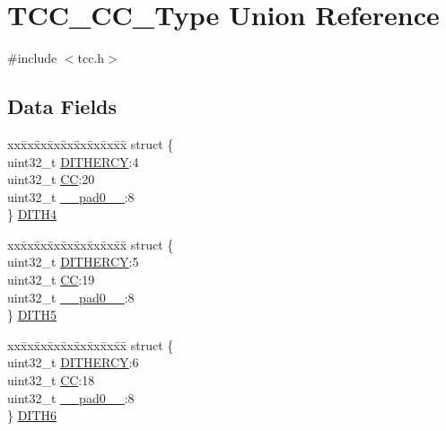 \hypertarget{union_t_c_c___c_c___type}{}\section{T\+C\+C\+\_\+\+C\+C\+\_\+\+Type Union Reference}
\label{union_t_c_c___c_c___type}


{\ttfamily \#include $<$tcc.\+h$>$}

\subsection*{Data Fields}
\begin{DoxyCompactItemize}
\item 
\begin{tabbing}
xx\=xx\=xx\=xx\=xx\=xx\=xx\=xx\=xx\=\kill
struct \{\\
\>uint32\_t \mbox{\hyperlink{union_t_c_c___c_c___type_a1e7fc84641e39de898f29ee9268f22aa}{DITHERCY}}:4\\
\>uint32\_t \mbox{\hyperlink{union_t_c_c___c_c___type_a10f2b0518af5a37e14c710d230272d1d}{CC}}:20\\
\>uint32\_t \mbox{\hyperlink{union_t_c_c___c_c___type_a3e57c2ef1c3ffb36722f000cc1156824}{\_\_pad0\_\_}}:8\\
\} \mbox{\hyperlink{union_t_c_c___c_c___type_adeba68363c81bde605f391e07458b2a8}{DITH4}}\\

\end{tabbing}\item 
\begin{tabbing}
xx\=xx\=xx\=xx\=xx\=xx\=xx\=xx\=xx\=\kill
struct \{\\
\>uint32\_t \mbox{\hyperlink{union_t_c_c___c_c___type_a1e7fc84641e39de898f29ee9268f22aa}{DITHERCY}}:5\\
\>uint32\_t \mbox{\hyperlink{union_t_c_c___c_c___type_a10f2b0518af5a37e14c710d230272d1d}{CC}}:19\\
\>uint32\_t \mbox{\hyperlink{union_t_c_c___c_c___type_a3e57c2ef1c3ffb36722f000cc1156824}{\_\_pad0\_\_}}:8\\
\} \mbox{\hyperlink{union_t_c_c___c_c___type_acd2104636914a582089bbca8543dbfa1}{DITH5}}\\

\end{tabbing}\item 
\begin{tabbing}
xx\=xx\=xx\=xx\=xx\=xx\=xx\=xx\=xx\=\kill
struct \{\\
\>uint32\_t \mbox{\hyperlink{union_t_c_c___c_c___type_a1e7fc84641e39de898f29ee9268f22aa}{DITHERCY}}:6\\
\>uint32\_t \mbox{\hyperlink{union_t_c_c___c_c___type_a10f2b0518af5a37e14c710d230272d1d}{CC}}:18\\
\>uint32\_t \mbox{\hyperlink{union_t_c_c___c_c___type_a3e57c2ef1c3ffb36722f000cc1156824}{\_\_pad0\_\_}}:8\\
\} \mbox{\hyperlink{union_t_c_c___c_c___type_a11358bf847174b043983a142e19b116d}{DITH6}}\\


\end{tabbing}
\end{DoxyCompactItemize}
